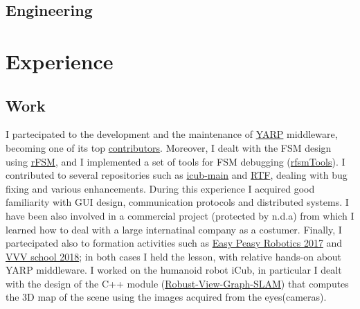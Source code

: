 \documentclass[10pt,a4paper]{moderncv}
\begin{document}
\subsection{Engineering}
\newpage
\section{Experience}
\subsection{Work}
{
I partecipated to the development and the maintenance of \href{https://github.com/robotology/yarp}{YARP} middleware, becoming one of its top \href{https://github.com/robotology/yarp/graphs/contributors}{contributors}.
Moreover, I dealt with the FSM design using \href{https://people.mech.kuleuven.be/~bruyninc/rFSM/doc/README.html}{rFSM}, and I implemented a set of tools for FSM debugging (\href{https://robotology.github.io/rfsmTools/}{rfsmTools}).
I contributed to several repositories such as \href{https://github.com/robotology/icub-main}{icub-main} and \href{https://github.com/robotology/robot-testing}{RTF}, dealing with bug fixing and various enhancements. During this experience I acquired good familiarity with GUI design, communication protocols and distributed systems. I have been also involved in a commercial project (protected by n.d.a) from which I learned how to deal with a large internatinal company as a costumer. Finally, I partecipated also to formation activities such as \href{https://easy-peasy-robotics.github.io/editions/mfr17/course-program.html}{Easy Peasy Robotics 2017} and \href{http://www.icub.org/school/2018}{VVV school 2018}; in both cases I held the lesson, with relative hands-on about YARP middleware.}
{I worked on the humanoid robot iCub, in particular I dealt with the design of the C++ module (\href{https://github.com/robotology-playground/Robust-View-Graph-SLAM}{Robust-View-Graph-SLAM}) that computes the 3D map of the scene using the images acquired from the eyes(cameras).}
\end{document}
